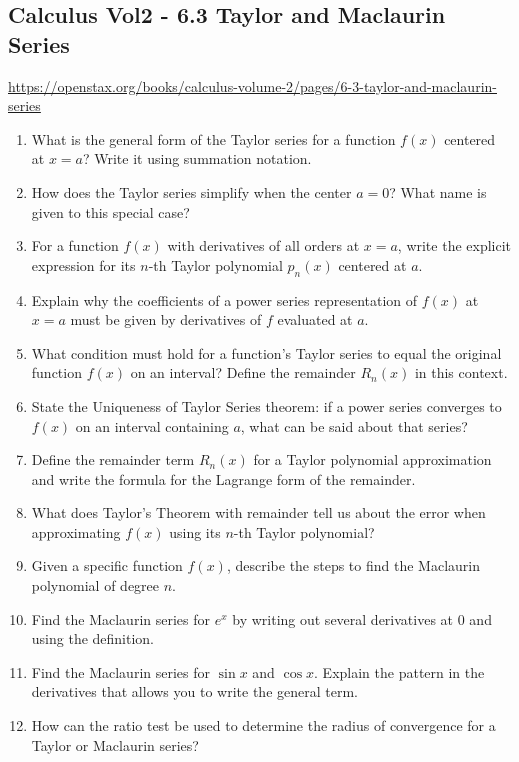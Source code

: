 \subsection{Calculus Vol2 - 6.3 Taylor and Maclaurin Series}

\url{https://openstax.org/books/calculus-volume-2/pages/6-3-taylor-and-maclaurin-series}

\begin{enumerate}
  \item What is the general form of the Taylor series for a function \(f(x)\) centered at \(x=a\)? Write it using summation notation.
  \item How does the Taylor series simplify when the center \(a=0\)? What name is given to this special case?
  \item For a function \(f(x)\) with derivatives of all orders at \(x=a\), write the explicit expression for its \(n\)-th Taylor polynomial \(p_{n}(x)\) centered at \(a\).
  \item Explain why the coefficients of a power series representation of \(f(x)\) at \(x=a\) must be given by derivatives of \(f\) evaluated at \(a\).
  \item What condition must hold for a function's Taylor series to equal the original function \(f(x)\) on an interval? Define the remainder \(R_{n}(x)\) in this context.
  \item State the Uniqueness of Taylor Series theorem: if a power series converges to \(f(x)\) on an interval containing \(a\), what can be said about that series?
  \item Define the remainder term \(R_{n}(x)\) for a Taylor polynomial approximation and write the formula for the Lagrange form of the remainder.
  \item What does Taylor's Theorem with remainder tell us about the error when approximating \(f(x)\) using its \(n\)-th Taylor polynomial?
  \item Given a specific function \(f(x)\), describe the steps to find the Maclaurin polynomial of degree \(n\).
  \item Find the Maclaurin series for \(e^{x}\) by writing out several derivatives at 0 and using the definition.
  \item Find the Maclaurin series for \(\sin x\) and \(\cos x\). Explain the pattern in the derivatives that allows you to write the general term.
  \item How can the ratio test be used to determine the radius of convergence for a Taylor or Maclaurin series?

\end{enumerate}
